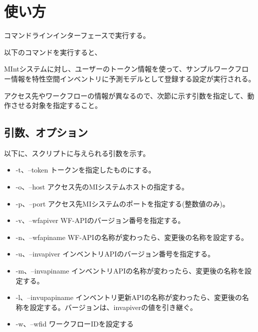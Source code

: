 \documentclass[letterpaper,10pt,dvipdfmx,openany]{sphinxmanual}
\begin{document}
\section{使い方}
\label{\detokenize{doc/20200218_How2Use_predict_conf_upload:id5}}
コマンドラインインターフェースで実行する。

以下のコマンドを実行すると、

\begin{sphinxVerbatim}[commandchars=\\\{\}]
\end{sphinxVerbatim}

MIntシステムに対し、ユーザーのトークン情報を使って、サンプルワークフロー情報を特性空間インベントリに予測モデルとして登録する設定が実行される。

アクセス先やワークフローの情報が異なるので、次節に示す引数を指定して、動作させる対象を指定すること。


\subsection{引数、オプション}
\label{\detokenize{doc/20200218_How2Use_predict_conf_upload:id6}}
以下に、スクリプトに与えられる引数を示す。
\begin{itemize}
\item {} 
-t、--token トークンを指定したものにする。

\item {} 
-o、--host アクセス先のMIシステムホストの指定する。

\item {} 
-p、--port アクセス先MIシステムのポートを指定する(整数値のみ)。

\item {} 
-v、--wfapiver WF-APIのバージョン番号を指定する。

\item {} 
-n、--wfapiname WF-APIの名称が変わったら、変更後の名称を設定する。

\item {} 
-u、--invapiver インベントリAPIのバージョン番号を指定する。

\item {} 
-m、--invapiname インベントリAPIの名称が変わったら、変更後の名称を設定する。

\item {} 
-l、--invupapiname インベントリ更新APIの名称が変わったら、変更後の名称を設定する。バージョンは、invapiverの値を引き継ぐ。

\item {} 
-w、--wfid ワークフローIDを設定する

\end{itemize}
\end{document}
